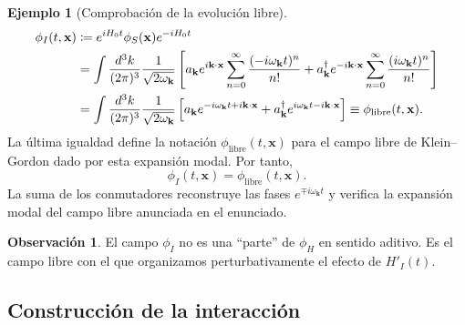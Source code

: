 \documentclass[11pt,letterpaper]{article}
\theoremstyle{definition}
\theoremstyle{definition}
\newtheorem{observacion}{Observación}
\newtheorem{ejemplo}{Ejemplo}
\newcommand{\eqbox}[1]{\boxed{\displaystyle #1}}
\begin{document}
\begin{ejemplo}[Comprobación de la evolución libre]
\begin{align}
  \phi_I(t,\mathbf{x})
  &\coloneqq e^{iH_0t}\phi_S(\mathbf{x})e^{-iH_0t}
  \notag\\
  &=
  \int\frac{d^3k}{(2\pi)^3}
  \frac{1}{\sqrt{2\omega_{\mathbf{k}}}}
  \left[
    a_{\mathbf{k}}e^{i\mathbf{k}\cdot\mathbf{x}}
    \sum_{n=0}^{\infty}\frac{(-i\omega_{\mathbf{k}}t)^n}{n!}
    +
    a_{\mathbf{k}}^\dagger e^{-i\mathbf{k}\cdot\mathbf{x}}
    \sum_{n=0}^{\infty}\frac{(i\omega_{\mathbf{k}}t)^n}{n!}
  \right]
  \notag\\
  &=
  \int\frac{d^3k}{(2\pi)^3}
  \frac{1}{\sqrt{2\omega_{\mathbf{k}}}}
  \left[
    a_{\mathbf{k}}e^{-i\omega_{\mathbf{k}}t+i\mathbf{k}\cdot\mathbf{x}}
    +
    a_{\mathbf{k}}^\dagger
    e^{i\omega_{\mathbf{k}}t-i\mathbf{k}\cdot\mathbf{x}}
  \right]
  \equiv\phi_{\mathrm{libre}}(t,\mathbf{x}).
  \label{eq:BCHsubstitutionField}
\end{align}
La última igualdad define la notación $\phi_{\mathrm{libre}}(t,\mathbf{x})$
para el campo libre de Klein--Gordon dado por esta expansión modal. Por tanto,
\begin{equation}
  \eqbox{\phi_I(t,\mathbf{x})=\phi_{\mathrm{libre}}(t,\mathbf{x}).}
  \label{eq:BCHrecoversField}
\end{equation}
La suma de los conmutadores reconstruye las fases $e^{\mp i\omega_{\mathbf{k}}t}$
y verifica la expansión modal del campo libre anunciada en el enunciado.
\end{ejemplo}

\begin{observacion}
El campo $\phi_I$ no es una ``parte'' de $\phi_H$ en sentido aditivo.
Es el campo libre con el que organizamos perturbativamente el efecto de
$H'_I(t)$.
\end{observacion}

\subsection{Construcción de la interacción}
\end{document}
